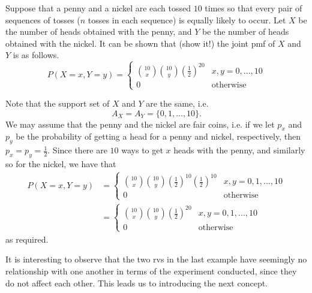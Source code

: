 \documentclass[notoc,notitlepage]{tufte-book}
\begin{document}
\begin{eg}[Example 3.5]
  Suppose that a penny and a nickel are each tossed $10$ times so that every pair of sequences of tosses ($n$ tosses in each sequence) is equally likely to occur. Let $X$ be the number of heads obtained with the penny, and $Y$ be the number of heads obtained with the nickel. It can be shown that (show it!) the joint pmf of $X$ and $Y$ is as follows.
  \begin{equation*}
    P(X = x, Y = y) = \begin{cases}
      \binom{10}{x} \binom{10}{y} \left( \frac{1}{2} \right)^{20} & x, y = 0, ..., 10 \\
      0                                                           & \text{otherwise}
    \end{cases}
  \end{equation*}

  \begin{solution}
    Note that the support set of $X$ and $Y$ are the same, i.e.
    \begin{equation*}
      A_X = A_Y = \{ 0, 1, ..., 10 \}.
    \end{equation*}
    We may assume that the penny and the nickel are fair coins, i.e. if we let $p_x$ and $p_y$ be the probability of getting a head for a penny and nickel, respectively, then $p_x = p_y = \frac{1}{2}$. Since there are $10$ ways to get $x$ heads with the penny, and similarly so for the nickel, we have that
    \begin{align*}
      P(X = x, Y = y) &= \begin{cases}
        \binom{10}{x} \binom{10}{y} \left( \frac{1}{2} \right)^{10} \left( \frac{1}{2} \right)^{10} & x, y = 0, 1, ..., 10 \\
        0            & \text{otherwise}
      \end{cases} \\
      &= \begin{cases}
        \binom{10}{x} \binom{10}{y} \left( \frac{1}{2} \right)^{20} & x, y = 0, 1, ... , 10 \\
        0   & \text{otherwise}
      \end{cases}
    \end{align*}
    as required.
  \end{solution}
\end{eg}

\begin{note}
  It is interesting to observe that the two rvs in the last example have seemingly no relationship with one another in terms of the experiment conducted, since they do not affect each other. This leads us to introducing the next concept.
\end{note}
\end{document}
